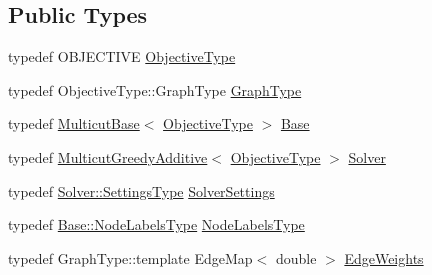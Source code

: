 \subsection*{Public Types}
\begin{DoxyCompactItemize}
\item 
typedef O\+B\+J\+E\+C\+T\+I\+VE \hyperlink{classnifty_1_1graph_1_1opt_1_1multicut_1_1WatershedProposals_a2ea604fcb16dc28bf52164ec5b3f232a}{Objective\+Type}
\item 
typedef Objective\+Type\+::\+Graph\+Type \hyperlink{classnifty_1_1graph_1_1opt_1_1multicut_1_1WatershedProposals_a1b552b5ad2f22af891c4e83fc3b324cf}{Graph\+Type}
\item 
typedef \hyperlink{classnifty_1_1graph_1_1opt_1_1multicut_1_1MulticutBase}{Multicut\+Base}$<$ \hyperlink{classnifty_1_1graph_1_1opt_1_1multicut_1_1WatershedProposals_a2ea604fcb16dc28bf52164ec5b3f232a}{Objective\+Type} $>$ \hyperlink{classnifty_1_1graph_1_1opt_1_1multicut_1_1WatershedProposals_a5484630cc07bc37751c4262e40a059f8}{Base}
\item 
typedef \hyperlink{classnifty_1_1graph_1_1opt_1_1multicut_1_1MulticutGreedyAdditive}{Multicut\+Greedy\+Additive}$<$ \hyperlink{classnifty_1_1graph_1_1opt_1_1multicut_1_1WatershedProposals_a2ea604fcb16dc28bf52164ec5b3f232a}{Objective\+Type} $>$ \hyperlink{classnifty_1_1graph_1_1opt_1_1multicut_1_1WatershedProposals_ac5c603312951d07e9fc516ad4c99c7df}{Solver}
\item 
typedef \hyperlink{classnifty_1_1graph_1_1opt_1_1multicut_1_1MulticutGreedyAdditive_a074ee39f5884cff7359f5c0997929e2f}{Solver\+::\+Settings\+Type} \hyperlink{classnifty_1_1graph_1_1opt_1_1multicut_1_1WatershedProposals_ae59892ab06d67fc3099a0e352e4e51b9}{Solver\+Settings}
\item 
typedef \hyperlink{classnifty_1_1graph_1_1opt_1_1common_1_1SolverBase_abefd51561de2fd009f6bed6bef6009ea}{Base\+::\+Node\+Labels\+Type} \hyperlink{classnifty_1_1graph_1_1opt_1_1multicut_1_1WatershedProposals_a41e2d6c837cbe4d58aa4279419483723}{Node\+Labels\+Type}
\item 
typedef Graph\+Type\+::template Edge\+Map$<$ double $>$ \hyperlink{classnifty_1_1graph_1_1opt_1_1multicut_1_1WatershedProposals_abd0739ab4f295cc667a246a878dfff43}{Edge\+Weights}
\end{DoxyCompactItemize}
